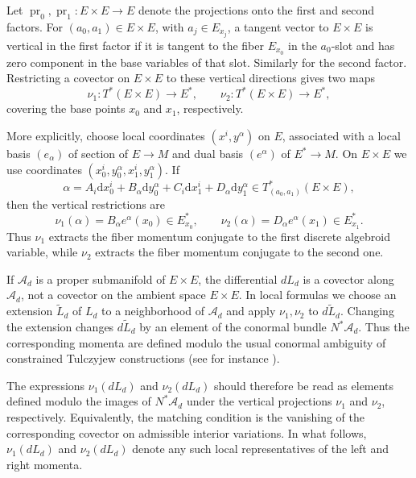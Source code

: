\documentclass[11pt]{article}
\newcommand{\dd}{\mathrm{d}}
\begin{document}
Let $\operatorname{pr}_0,\operatorname{pr}_1:E\times E\longrightarrow E$ denote the projections onto the first and second factors. For
\((a_0,a_1)\in E\times E\), with \(a_j\in E_{x_j}\), a tangent vector to
\(E\times E\) is vertical in the first factor if it is tangent to the fiber
\(E_{x_0}\) in the \(a_0\)-slot and has zero component in the base variables of
that slot. Similarly for the second factor. Restricting a covector on
\(E\times E\) to these vertical directions gives two maps
\[
\nu_1:T^*(E\times E)\longrightarrow E^*,
\qquad
\nu_2:T^*(E\times E)\longrightarrow E^*,
\]
covering the base points \(x_0\) and \(x_1\), respectively.

More explicitly, choose local coordinates \((x^i,y^\alpha)\) on \(E\), associated
with a local basis \((e_\alpha)\) of section of \(E\to M\) and dual basis
\((e^\alpha)\) of \(E^*\to M\). On \(E\times E\) we use coordinates $(x_0^i,y_0^\alpha,x_1^i,y_1^\alpha)$. If
\[
\alpha
=
A_i\dd x_0^i+B_\alpha\dd y_0^\alpha
+
C_i\dd x_1^i+D_\alpha\dd y_1^\alpha
\in T^*_{(a_0,a_1)}(E\times E),
\]
then the vertical restrictions are
\[
\nu_1(\alpha)=B_\alpha e^\alpha(x_0)\in E^*_{x_0},
\qquad
\nu_2(\alpha)=D_\alpha e^\alpha(x_1)\in E^*_{x_1}.
\]
Thus \(\nu_1\) extracts the fiber momentum conjugate to the first discrete
algebroid variable, while \(\nu_2\) extracts the fiber momentum conjugate to the
second one.


If \(\mathcal A_d\) is a proper submanifold of \(E \times E\), the differential \(dL_d\)
is a covector along \(\mathcal A_d\), not a covector on the ambient space \(E \times E\).
In local formulas we choose an extension \(\widetilde L_d\) of \(L_d\) to a
neighborhood of \(\mathcal A_d\) and apply \(\nu_1,\nu_2\) to \(d\widetilde L_d\).
Changing the extension changes \(d\widetilde L_d\) by an element of the conormal
bundle \(N^*\mathcal A_d\). Thus the corresponding momenta are defined modulo the usual
conormal ambiguity of constrained Tulczyjew constructions (see for instance \cite{deLeonJimenezMartinDeDiego2012}).

The expressions \(\nu_1(dL_d)\) and \(\nu_2(dL_d)\) should therefore be read as
elements defined modulo the images of \(N^*\mathcal A_d\) under the vertical projections
\(\nu_1\) and \(\nu_2\), respectively. Equivalently, the matching condition is
the vanishing of the corresponding covector on admissible interior variations.
In what follows, \(\nu_1(dL_d)\) and \(\nu_2(dL_d)\) denote any such local
representatives of the left and right momenta.
\end{document}
